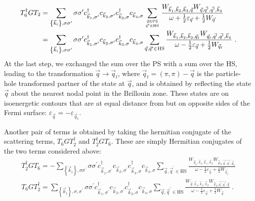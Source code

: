 \documentclass{revtex4-2}
\begin{document}
\begin{equation}\begin{aligned}\label{t2t62}
	T_6^\dagger G T_2 &= \sum_{\left\{\vec k_i\right\}, \sigma\sigma^\prime}\sigma\sigma^\prime c^\dagger_{\vec k_1,\sigma^\prime}c_{\vec k_2,\sigma^\prime} c^\dagger_{\vec k_3,\sigma} c_{\vec k_4,\sigma}\sum_{\vec q\in\text{PS}\atop{\vec q^\prime \in \text{HS}}}\frac{W_{\vec k_1,\vec k_2,\vec k_3,\vec q} W_{\vec q,\vec{q^\prime},\vec{q^\prime},\vec k_4}}{\omega + \frac{1}{2}\varepsilon_{\vec q} + \frac{1}{2}W_{\vec q}} \\
						  &= \sum_{\left\{\vec k_i\right\}, \sigma\sigma^\prime}\sigma\sigma^\prime c^\dagger_{\vec k_1,\sigma^\prime}c_{\vec k_2,\sigma^\prime} c^\dagger_{\vec k_3,\sigma} c_{\vec k_4,\sigma}\sum_{\vec q,\vec q^\prime\in\text{HS}}\frac{W_{\vec k_1,\vec k_2,\vec k_3,\vec q_t} W_{\vec q_t,\vec{q^\prime},\vec{q^\prime},\vec k_4}}{\omega - \frac{1}{2}\varepsilon_{\vec q} + \frac{1}{2}W_{\vec q_t}}~.
\end{aligned}\end{equation}
At the last step, we exchanged the sum over the PS with a sum over the HS, leading to the transformation \(\vec q \to \vec q_t\), where \(\vec q_t = \left( \pi, \pi \right) - \vec q\) is the particle-hole transformed partner of the state at \(\vec q\), and is obtained by reflecting the state \(\vec q\) about the nearest nodal point in the Brillouin zone. These states are on isoenergetic contours that are at equal distance from but on opposite sides of the Fermi surface: \(\varepsilon_{\vec q} = -\varepsilon_{\vec q_t}\). 

Another pair of terms is obtained by taking the hermitian conjugate of the scattering terms, \(T_6 G T_2^\dagger\) and \(T_2^\dagger G T_6\). These are simply Hermitian conjugates of the two terms considered above:
\begin{equation}\begin{aligned}
		T_2^\dagger G T_6 = -\sum_{\left\{\vec k_i\right\}, \sigma\sigma^\prime}\sigma\sigma^\prime c^\dagger_{\vec k_1,\sigma^\prime}c_{\vec k_2,\sigma^\prime} c^\dagger_{\vec k_3,\sigma} c_{\vec k_4,\sigma}\sum_{\vec q,\vec q^\prime\in\text{HS}}\frac{W_{\vec q_t,\vec k_4,\vec k_1,\vec k_2} W_{\vec k_3,\vec{q^\prime},\vec{q^\prime},\vec q_t}}{\omega - \frac{1}{2}\varepsilon_{\vec q} + \frac{1}{2}W_{\vec q_t}}\\
		T_6 G T_2^\dagger = \sum_{\left\{\vec k_i\right\}, \sigma, \sigma^\prime} \sigma\sigma^\prime c^\dagger_{\vec k_1,\sigma^\prime}c_{\vec k_2,\sigma^\prime} c^\dagger_{\vec k_3,\sigma} c_{\vec k_4,\sigma}\sum_{\vec q, \vec q^\prime\in\text{HS}}\frac{W_{\vec q,\vec k_4,\vec k_1,\vec k_2} W_{\vec k_3,\vec{q^\prime},\vec{q^\prime},\vec q}}{\omega - \frac{1}{2}\varepsilon_{\vec q} + \frac{1}{2}W_{\vec q}}~.
\end{aligned}\end{equation}
\end{document}
